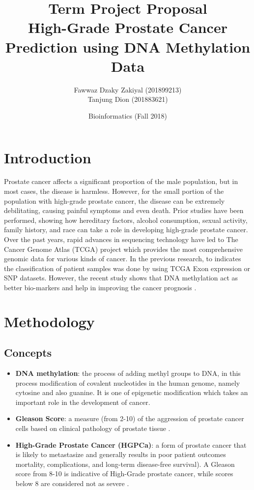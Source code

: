 \documentclass[a4paper,oneside]{article}
\begin{document}
\title{\vspace{-0.7in}Term Project Proposal\\
High-Grade Prostate Cancer Prediction using DNA Methylation Data}
\author{Fawwaz Dzaky Zakiyal (201899213)\\Tanjung Dion (201883621)\\}
\date{Bioinformatics (Fall 2018)}
\maketitle
 
\section{Introduction}
Prostate cancer affects a significant proportion of the male population, but in most cases, the disease is harmless. However, for the small portion of the population with high-grade prostate cancer, the disease can be extremely debilitating, causing painful symptoms and even death. Prior studies have been performed, showing how hereditary factors, alcohol consumption, sexual activity, family history, and race can take a role in developing high-grade prostate cancer. Over the past years, rapid advances in sequencing technology have led to The Cancer Genome Atlas (TCGA) project which provides the most comprehensive genomic data for various kinds of cancer. In the previous research, to indicates the classification of patient samples was done by using TCGA Exon expression or SNP datasets. However, the recent study shows that DNA methylation act as better bio-markers and help in improving the cancer prognosis \cite{one}.


\section{Methodology}
\subsection{Concepts}
\begin{itemize}
\item \textbf{DNA methylation}: the process of adding methyl groups to DNA, in this process modification of covalent nucleotides in the human genome, namely cytosine and also guanine. It is one of epigenetic modification which takes an important role in the development of cancer.
\item \textbf{Gleason Score}: a measure (from 2-10) of the aggression of prostate cancer cells based on clinical pathology of prostate tissue \cite{four}.
\item \textbf{High-Grade Prostate Cancer (HGPCa)}: a form of prostate cancer that is likely to metastasize and generally results in poor patient outcomes mortality, complications, and long-term disease-free survival). A Gleason score from 8-10 is indicative of High-Grade prostate cancer, while scores below 8 are considered not as severe \cite{four}.
\end{itemize}
\end{document}
